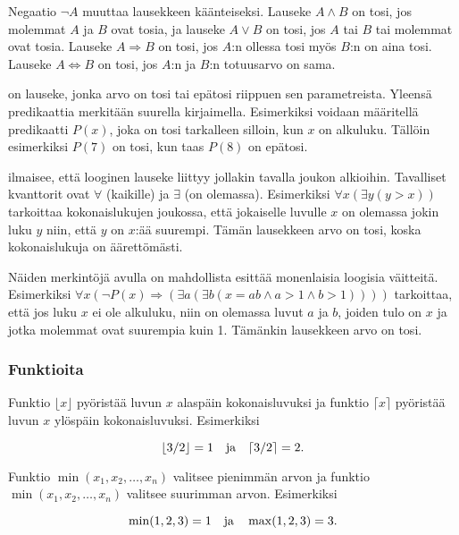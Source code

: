 Negaatio $\lnot A$ muuttaa lausekkeen käänteiseksi.
Lauseke $A \land B$ on tosi, jos molemmat $A$ ja $B$ ovat tosia,
ja lauseke $A \lor B$ on tosi, jos $A$ tai $B$ tai molemmat
ovat tosia.
Lauseke $A \Rightarrow B$ on tosi,
jos $A$:n ollessa tosi myös $B$:n on aina tosi.
Lauseke $A \Leftrightarrow B$ on tosi,
jos $A$:n ja $B$:n totuusarvo on sama.


 on lauseke, jonka arvo on tosi tai epätosi
riippuen sen parametreista.
Yleensä predikaattia merkitään suurella kirjaimella.
Esimerkiksi voidaan määritellä predikaatti $P(x)$,
joka on tosi tarkalleen silloin, kun $x$ on alkuluku.
Tällöin esimerkiksi $P(7)$ on tosi, kun taas $P(8)$ on epätosi.


 ilmaisee, että looginen
lauseke liittyy jollakin tavalla joukon alkioihin.
Tavalliset kvanttorit
ovat $\forall$ (kaikille) ja $\exists$ (on olemassa).
Esimerkiksi $\forall x (\exists y (y > x))$
tarkoittaa kokonaislukujen joukossa,
että jokaiselle luvulle $x$ on olemassa
jokin luku $y$ niin, että $y$ on $x$:ää suurempi.
Tämän lausekkeen arvo on tosi, koska kokonaislukuja
on äärettömästi.

Näiden merkintöjä avulla on mahdollista esittää
monenlaisia loogisia väitteitä.
Esimerkiksi
$\forall x (\lnot P(x) \Rightarrow (\exists a (\exists b (x = ab \land a > 1 \land b > 1))))$
tarkoittaa, että jos luku $x$ ei ole alkuluku,
niin on olemassa luvut $a$ ja $b$,
joiden tulo on $x$ ja jotka molemmat ovat suurempia kuin 1.
Tämänkin lausekkeen arvo on tosi.


\subsubsection{Funktioita}

Funktio $\lfloor x \rfloor$ pyöristää luvun $x$
alaspäin kokonaisluvuksi ja
funktio $\lceil x \rceil$ pyöristää luvun $x$
ylöspäin kokonaisluvuksi. Esimerkiksi

\[ \lfloor 3/2 \rfloor = 1 \hspace{10px} \textrm{ja} \hspace{10px} \lceil 3/2 \rceil = 2.\]

\noindent
Funktio $\min(x_1,x_2,\ldots,x_n)$ valitsee pienimmän arvon
ja
funktio $\min(x_1,x_2,\ldots,x_n)$ valitsee suurimman arvon.
Esimerkiksi

\[ \min(1,2,3)=1 \hspace{10px} \textrm{ja} \hspace{10px} \max(1,2,3)=3.\]

